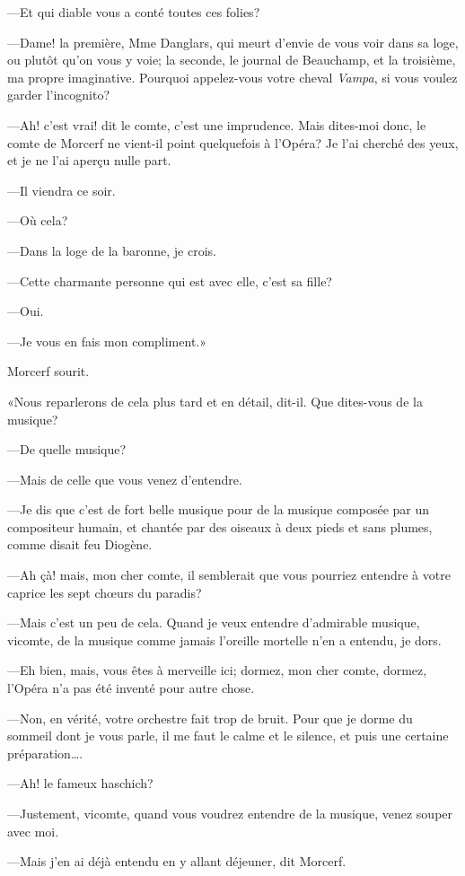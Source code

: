 —Et qui diable vous a conté toutes ces folies? 

—Dame! la première, Mme Danglars, qui meurt d'envie de vous voir dans sa loge, ou plutôt qu'on vous y voie; la seconde, le journal de Beauchamp, et la troisième, ma propre imaginative. Pourquoi appelez-vous votre cheval \textit{Vampa}, si vous voulez garder l'incognito? 

—Ah! c'est vrai! dit le comte, c'est une imprudence. Mais dites-moi donc, le comte de Morcerf ne vient-il point quelquefois à l'Opéra? Je l'ai cherché des yeux, et je ne l'ai aperçu nulle part. 

—Il viendra ce soir. 

—Où cela? 

—Dans la loge de la baronne, je crois. 

—Cette charmante personne qui est avec elle, c'est sa fille? 

—Oui. 

—Je vous en fais mon compliment.» 

Morcerf sourit. 

«Nous reparlerons de cela plus tard et en détail, dit-il. Que dites-vous de la musique? 

—De quelle musique? 

—Mais de celle que vous venez d'entendre. 

—Je dis que c'est de fort belle musique pour de la musique composée par un compositeur humain, et chantée par des oiseaux à deux pieds et sans plumes, comme disait feu Diogène. 

—Ah çà! mais, mon cher comte, il semblerait que vous pourriez entendre à votre caprice les sept chœurs du paradis? 

—Mais c'est un peu de cela. Quand je veux entendre d'admirable musique, vicomte, de la musique comme jamais l'oreille mortelle n'en a entendu, je dors. 

—Eh bien, mais, vous êtes à merveille ici; dormez, mon cher comte, dormez, l'Opéra n'a pas été inventé pour autre chose. 

—Non, en vérité, votre orchestre fait trop de bruit. Pour que je dorme du sommeil dont je vous parle, il me faut le calme et le silence, et puis une certaine préparation\dots. 

—Ah! le fameux haschich? 

—Justement, vicomte, quand vous voudrez entendre de la musique, venez souper avec moi. 

—Mais j'en ai déjà entendu en y allant déjeuner, dit Morcerf. 


